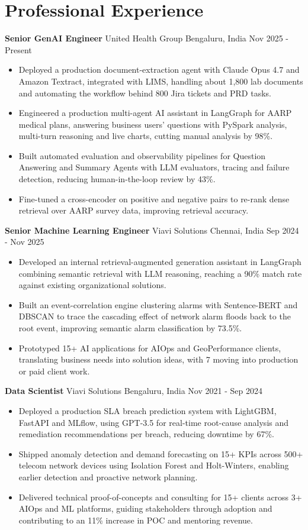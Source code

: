 \documentclass[10pt,a4paper]{article}
\newcommand{\role}[4]{\textbf{#1} \textbar{} #2 \hfill #3 \textbar{} #4\par}
\begin{document}
\section{Professional Experience}
\role{Senior GenAI Engineer}{United Health Group}{Bengaluru, India}{Nov 2025 - Present}
\begin{itemize}
  \item Deployed a production document-extraction agent with Claude Opus 4.7 and Amazon Textract, integrated with LIMS, handling about 1,800 lab documents and automating the workflow behind 800 Jira tickets and PRD tasks.
  \item Engineered a production multi-agent AI assistant in LangGraph for AARP medical plans, answering business users' questions with PySpark analysis, multi-turn reasoning and live charts, cutting manual analysis by 98\%.
  \item Built automated evaluation and observability pipelines for Question Answering and Summary Agents with LLM evaluators, tracing and failure detection, reducing human-in-the-loop review by 43\%.
  \item Fine-tuned a cross-encoder on positive and negative pairs to re-rank dense retrieval over AARP survey data, improving retrieval accuracy.
\end{itemize}
\vspace{3pt}
\role{Senior Machine Learning Engineer}{Viavi Solutions}{Chennai, India}{Sep 2024 - Nov 2025}
\begin{itemize}
  \item Developed an internal retrieval-augmented generation assistant in LangGraph combining semantic retrieval with LLM reasoning, reaching a 90\% match rate against existing organizational solutions.
  \item Built an event-correlation engine clustering alarms with Sentence-BERT and DBSCAN to trace the cascading effect of network alarm floods back to the root event, improving semantic alarm classification by 73.5\%.
  \item Prototyped 15+ AI applications for AIOps and GeoPerformance clients, translating business needs into solution ideas, with 7 moving into production or paid client work.
\end{itemize}
\vspace{3pt}
\role{Data Scientist}{Viavi Solutions}{Bengaluru, India}{Nov 2021 - Sep 2024}
\begin{itemize}
  \item Deployed a production SLA breach prediction system with LightGBM, FastAPI and MLflow, using GPT-3.5 for real-time root-cause analysis and remediation recommendations per breach, reducing downtime by 67\%.
  \item Shipped anomaly detection and demand forecasting on 15+ KPIs across 500+ telecom network devices using Isolation Forest and Holt-Winters, enabling earlier detection and proactive network planning.
  \item Delivered technical proof-of-concepts and consulting for 15+ clients across 3+ AIOps and ML platforms, guiding stakeholders through adoption and contributing to an 11\% increase in POC and mentoring revenue.
\end{itemize}
\end{document}
